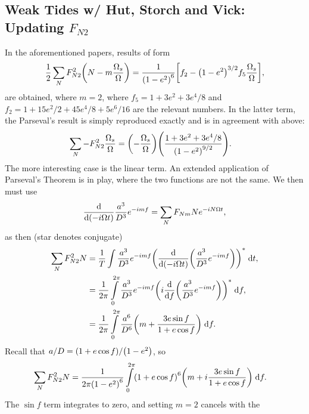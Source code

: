 \documentclass[11pt,
        usenames, %
        dvipsnames %
    ]{article}
\newcommand*{\rd}[2]{\frac{\mathrm{d}#1}{\mathrm{d}#2}}
\DeclarePairedDelimiter\p{\lparen}{\rparen}
\DeclarePairedDelimiter\s{\lbrack}{\rbrack}
\begin{document}
\subsection{Weak Tides w/ Hut, Storch and Vick: Updating $F_{N2}$}

In the aforementioned papers, results of form
\begin{equation}
    \frac{1}{2}\sum\limits_{N}F_{N2}^2 \p*{N - m\frac{\Omega_s}{\Omega}}
        = \frac{1}{\p*{1 - e^2}^6}\s*{f_2 - \p*{1 - e^2}^{3/2}
            f_5\frac{\Omega_s}{\Omega}},
\end{equation}
are obtained, where $m = 2$, where $f_5 = 1 + 3e^2 + 3e^4/8$ and $f_2 = 1 +
15e^2/2 + 45e^4/8 + 5e^6/16$ are the relevant numbers. In the latter term, the
Parseval's result is simply reproduced exactly and is in agreement with above:
\begin{align}
    \sum\limits_N -F_{N2}^2\frac{\Omega_s}{\Omega}
        &= \p*{-\frac{\Omega_s}{\Omega}}\p*{\frac{1 + 3e^2 + 3e^4/8}{
            \p*{1 - e^2}^{9/2}}}.
\end{align}
The more interesting case is the linear term. An extended application of
Parseval's Theorem is in play, where the two functions are not the same. We then
must use
\begin{equation}
    \rd{}{\p*{-i \Omega t}}\frac{a^3}{D^3}e^{-imf}
        = \sum\limits_N F_{Nm} Ne^{-iN\Omega t},
\end{equation}
as then (star denotes conjugate)
\begin{align}
    \sum\limits_N F_{N2}^2 N &= \frac{1}{T}\int\limits
        \frac{a^3}{D^3}e^{-imf}
            \p*{\rd{}{\p*{-i \Omega t}}\p*{\frac{a^3}{D^3}
                e^{-imf}}}^*\;\mathrm{d}t,\\
        &= \frac{1}{2\pi} \int\limits_0^{2\pi}
            \frac{a^3}{D^3}e^{-imf}
            \p*{i\rd{}{f}\p*{\frac{a^3}{D^3}
                e^{-imf}}}^*\;\mathrm{d}f,\\
        &= \frac{1}{2\pi} \int\limits_0^{2\pi}
            \frac{a^6}{D^6}\p*{m + \frac{3e\sin f}{1 + e\cos f}}
                \;\mathrm{d}f.
\end{align}
Recall that $a/D = \p*{1 + e\cos f} / \p*{1 - e^2}$, so
\begin{align}
    \sum\limits_N F_{N2}^2 N
        &= \frac{1}{2\pi\p*{1 - e^2}^6} \int\limits_0^{2\pi}
            \p*{1 + e\cos f}^6\p*{m + i\frac{3e\sin f}{1 + e\cos f}}
                \;\mathrm{d}f.
\end{align}
The $\sin f$ term integrates to zero, and setting $m = 2$ cancels with the
\end{document}
